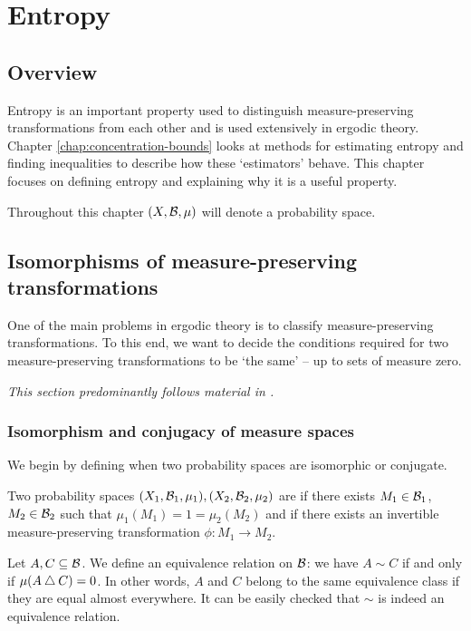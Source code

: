 \chapter{Entropy} \label{chap:entropy}
\section{Overview}
Entropy is an important property used to distinguish measure-preserving transformations from each other and is used extensively in ergodic theory. Chapter \ref{chap:concentration-bounds} looks at methods for estimating entropy and finding inequalities to describe how these `estimators' behave. This chapter focuses on defining entropy and explaining why it is a useful property.

Throughout this chapter $(X, \mathcal{B}, \mu)$ will denote a probability space.

\section{Isomorphisms of measure-preserving transformations}\label{sec:isos-of-mpts}
One of the main problems in ergodic theory is to classify measure-preserving transformations. To this end, we want to decide the conditions required for two measure-preserving transformations to be `the same' -- up to sets of measure zero.

\emph{This section predominantly follows material in \cite[Chapter 2]{walters:intro-to-ergodic-theory}.}

\subsection{Isomorphism and conjugacy of measure spaces}

We begin by defining when two probability spaces are isomorphic or conjugate.

\begin{definition}
	Two probability spaces $(X_1, \mathcal{B}_1, \mu_1), (X_2, \mathcal{B}_2, \mu_2)$ are  if there exists $M_1 \in \mathcal{B}_1$, $M_2 \in \mathcal{B}_2$ such that $\mu_1(M_1) = 1 = \mu_2(M_2)$ and if there exists an invertible measure-preserving transformation $\phi: M_1 \to M_2$.
\end{definition}

Let $A, C \subseteq \mathcal{B}$. We define an equivalence relation on $\mathcal{B}$: we have $A \sim C$ if and only if $\mu(A \bigtriangleup C) = 0$. In other words, $A$ and $C$ belong to the same equivalence class if they are equal almost everywhere. It can be easily checked that $\sim$ is indeed an equivalence relation.

